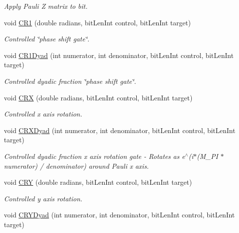 \begin{DoxyCompactItemize}
\begin{DoxyCompactList}\small\item\em Apply Pauli Z matrix to bit. \end{DoxyCompactList}\item 
void \hyperlink{classQrack_1_1Register_ad429509d1a525e7b1d8f0f5eafe4c3b6}{C\+R1} (double radians, bit\+Len\+Int control, bit\+Len\+Int target)
\begin{DoxyCompactList}\small\item\em Controlled \char`\"{}phase shift gate\char`\"{}. \end{DoxyCompactList}\item 
void \hyperlink{classQrack_1_1Register_a95684b53db07d5fa260407265640d9f5}{C\+R1\+Dyad} (int numerator, int denominator, bit\+Len\+Int control, bit\+Len\+Int target)
\begin{DoxyCompactList}\small\item\em Controlled dyadic fraction \char`\"{}phase shift gate\char`\"{}. \end{DoxyCompactList}\item 
void \hyperlink{classQrack_1_1Register_ab8e662e76a6bf68ee41ccfe5ec9e2afa}{C\+RX} (double radians, bit\+Len\+Int control, bit\+Len\+Int target)
\begin{DoxyCompactList}\small\item\em Controlled x axis rotation. \end{DoxyCompactList}\item 
void \hyperlink{classQrack_1_1Register_a9a76efb9a5266e3197d173ad3fb6b417}{C\+R\+X\+Dyad} (int numerator, int denominator, bit\+Len\+Int control, bit\+Len\+Int target)
\begin{DoxyCompactList}\small\item\em Controlled dyadic fraction x axis rotation gate -\/ Rotates as e$^\wedge$(i$\ast$(M\+\_\+\+PI $\ast$ numerator) / denominator) around Pauli x axis. \end{DoxyCompactList}\item 
void \hyperlink{classQrack_1_1Register_a75ff533dfaf55b824389c3e3de44b353}{C\+RY} (double radians, bit\+Len\+Int control, bit\+Len\+Int target)
\begin{DoxyCompactList}\small\item\em Controlled y axis rotation. \end{DoxyCompactList}\item 
void \hyperlink{classQrack_1_1Register_a69de3518cac8982bbef4e6fc66fae514}{C\+R\+Y\+Dyad} (int numerator, int denominator, bit\+Len\+Int control, bit\+Len\+Int target)

\end{DoxyCompactItemize}
